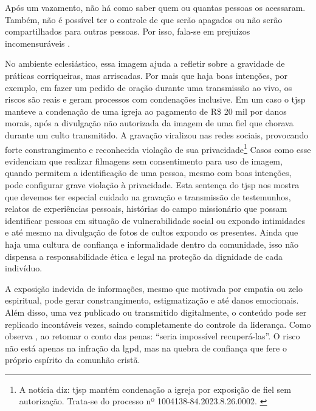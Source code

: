 \begin{citacao}
    Após um vazamento, não há como saber quem ou quantas pessoas os acessaram. Também, não é possível ter o controle de que serão apagados ou não serão compartilhados para outras pessoas. Por isso, fala-se em prejuízos incomensuráveis \cite{migalhas2023}.
\end{citacao}

No ambiente eclesiástico, essa imagem ajuda a refletir sobre a gravidade de práticas corriqueiras, mas arriscadas. Por mais que haja boas intenções, por exemplo, em fazer um pedido de oração durante uma transmissão ao vivo, os riscos são reais e geram processos com condenações inclusive. Em um caso o \gls{tjsp} manteve a condenação de uma igreja ao pagamento de R\$ 20 mil por danos morais, após a divulgação não autorizada da imagem de uma fiel que chorava durante um culto transmitido. A gravação viralizou nas redes sociais, provocando forte constrangimento e reconhecida violação de sua privacidade\footnote{A notícia diz: \gls{tjsp} mantém condenação a igreja por exposição de fiel sem autorização. Trata-se do processo nº 1004138-84.2023.8.26.0002. \cite{catedras2024}} Casos como esse evidenciam que realizar filmagens sem consentimento para uso de imagem, quando permitem a identificação de uma pessoa, mesmo com boas intenções, pode configurar grave violação à privacidade. Esta sentença do \gls{tjsp} nos mostra que devemos ter especial cuidado na gravação e transmissão de testemunhos, relatos de experiências pessoais, histórias do campo missionário que possam identificar pessoas em situação de vulnerabilidade social ou expondo intimidades e até mesmo na divulgação de fotos de cultos expondo os presentes. Ainda que haja uma cultura de confiança e informalidade dentro da comunidade, isso não dispensa a responsabilidade ética e legal na proteção da dignidade de cada indivíduo.

A exposição indevida de informações, mesmo que motivada por empatia ou zelo espiritual, pode gerar constrangimento, estigmatização e até danos emocionais. Além disso, uma vez publicado ou transmitido digitalmente, o conteúdo pode ser replicado incontáveis vezes, saindo completamente do controle da liderança. Como observa , ao retomar o conto das penas: ``seria impossível recuperá-las''. O risco não está apenas na infração da \gls{lgpd}, mas na quebra de confiança que fere o próprio espírito da comunhão cristã.

